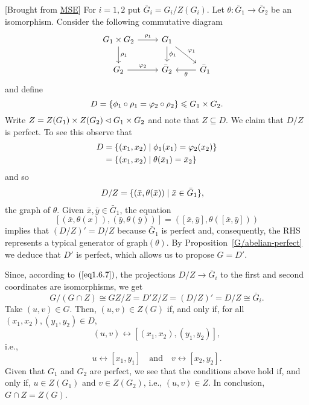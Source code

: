 \begin{solution}
\begin{solution} {[Brought from \href{https://math.stackexchange.com/a/3419168/269050}{MSE}]}
For $i=1,2$ put $\bar G_i=G_i/Z(G_i)$. Let $\theta\colon\bar G_1\to\bar G_2$ be an isomorphism. Consider the following commutative diagram
$$
    \begin{tikzcd}
        G_1\times G_2\arrow[d,"\rho_1"]\arrow[r,"\rho_1"]
            &G_1\arrow[rd,"\varphi_1"]\arrow[d,"\phi_1"]\\
        G_2\arrow[r,"\varphi_2"]
            &\bar G_2
            &\bar G_1\arrow[l,"\theta"]
    \end{tikzcd}
$$
and define
$$
    D = \{\phi_1\circ\rho_1=\varphi_2\circ\rho_2\}\leqslant G_1\times G_2.
$$
Write $Z=Z(G_1)\times Z(G_2)\lhd G_1\times G_2$ and note that $Z\subseteq D$. We claim that $D/Z$ is perfect. To see this observe that
\begin{align*}
    D &= \{(x_1,x_2)\mid \phi_1(x_1)=\varphi_2(x_2)\}\\
        &= \{(x_1,x_2)\mid \theta(\bar x_1)=\bar x_2\}
\end{align*}
and so
\begin{align}\label{eq1.6.7}
    D/Z &= \{(\bar x,\theta(\bar x))\mid\bar x\in\bar G_1\},
\end{align}
the graph of $\theta$. Given $\bar x,\bar y\in\bar G_1$, the equation
$$
    [(\bar x,\theta(x)),(\bar y,\theta(\bar y))]
        = ([\bar x,\bar y],\theta([\bar x,\bar y]))
$$
implies that $(D/Z)'=D/Z$ because $\bar G_1$ is perfect and, consequently, the RHS represents a typical generator of graph$(\theta)$. By Proposition~\ref{G/abelian-perfect} we deduce that $D'$ is perfect, which allows us to propose $G=D'$.

Since, according to $(\ref{eq1.6.7})$, the projections $D/Z\to\bar G_i$ to the first and second coordinates are isomorphisms, we get
$$
    G/(G\cap Z) \cong GZ/Z = D'Z/Z = (D/Z)' = D/Z \cong \bar G_i.
$$
Take $(u,v)\in G$. Then, $(u,v)\in Z(G)$ if, and only if, for all $(x_1,x_2),(y_1,y_2)\in D$,
$$
    (u,v)\leftrightarrow[(x_1,x_2),(y_1,y_2)],
$$
i.e.,
$$
    u\leftrightarrow[x_1,y_1]\quad\text{and}\quad
        v\leftrightarrow[x_2,y_2].
$$
Given that $G_1$ and $G_2$ are perfect, we see that the conditions above hold if, and only if, $u\in Z(G_1)$ and $v\in Z(G_2)$, i.e., $(u,v)\in Z$. In conclusion, $G\cap Z=Z(G)$.


\end{solution}
\end{solution}
